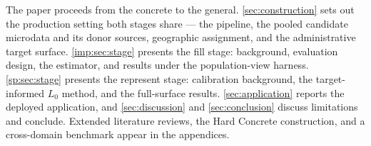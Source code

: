 The paper proceeds from the concrete to the general.
\autoref{sec:construction} sets out the production setting both
stages share --- the pipeline, the pooled candidate microdata and its
donor sources, geographic assignment, and the administrative target
surface. \autoref{imp:sec:stage} presents the fill stage: background,
evaluation design, the estimator, and results under the
population-view harness. \autoref{sp:sec:stage} presents the
represent stage: calibration background, the target-informed $L_0$
method, and the full-surface results. \autoref{sec:application}
reports the deployed application, and \autoref{sec:discussion} and
\autoref{sec:conclusion} discuss limitations and conclude. Extended
literature reviews, the Hard Concrete construction, and a
cross-domain benchmark appear in the appendices.

